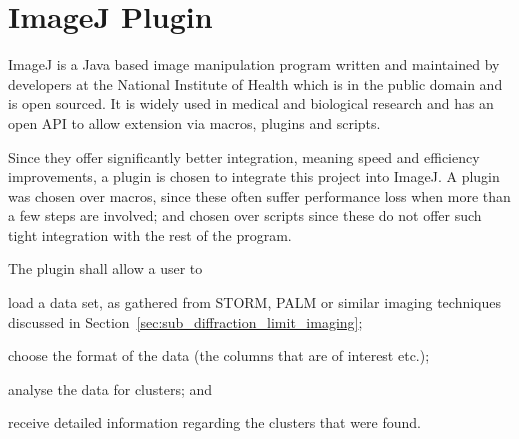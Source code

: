
\part{ImageJ Plugin}
\label{prt:imagej_plugin}

ImageJ is a Java based image manipulation program written and maintained by
developers at the National Institute of Health which is in the public domain
and is open sourced. It is widely used in medical and biological research and
has an open API to allow extension via macros, plugins and scripts.

Since they offer significantly better integration, meaning speed and efficiency
improvements, a plugin is chosen to integrate this project into ImageJ. A
plugin was chosen over macros, since these often suffer performance loss when
more than a few steps are involved; and chosen over scripts since these do not
offer such tight integration with the rest of the program.

The plugin shall allow a user to
\begin{enumerate*}[label=\itshape\alph*\upshape)]
	\item load a data set, as gathered from STORM, PALM or similar imaging
		techniques discussed in
		Section~\ref{sec:sub_diffraction_limit_imaging};
	\item choose the format of the data (the columns that are of interest
		etc.);
	\item analyse the data for clusters; and
	\item receive detailed information regarding the clusters that were found.
\end{enumerate*}

